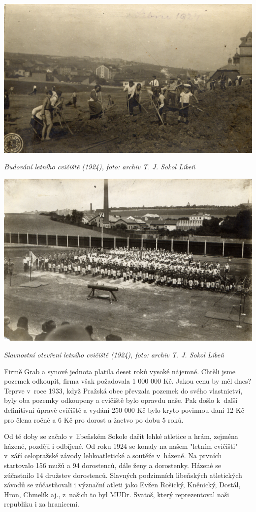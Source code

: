 \documentclass[a5paper, 11pt, twoside]{article}
\begin{document}
 \includegraphics[width=\textwidth]{img/25_budovani_cviciste.jpg}

\textit{Budování letního cvičiště (1924), foto: archiv T. J. Sokol Libeň}

 \includegraphics[width=\textwidth]{img/26_otevreni_cviciste.jpg}

\textit{Slavnostní otevření letního cvičiště (1924), foto: archiv T. J.
Sokol Libeň}

Firmě Grab a synové jednota platila deset roků vysoké nájemné. Chtěli
jsme pozemek odkoupit, firma však požadovala 1 000 000 Kč. Jakou cenu by
měl dnes? Teprve v~roce 1933, když Pražská obec převzala pozemek do
svého vlastnictví, byly oba pozemky odkoupeny a cvičiště bylo opravdu
naše. Pak došlo k~další definitivní úpravě cvičiště a vydání 250 000 Kč
bylo kryto povinnou daní 12 Kč pro člena ročně a 6 Kč pro dorost a
žactvo po dobu 5 roků.

Od té doby se začalo v~libeňském Sokole dařit lehké atletice a hrám,
zejména házené, později i odbíjené. Od roku 1924 se konaly na našem
"letním cvičišti" v~září celopražské závody lehkoatletické a soutěže
v~házené. Na prvních startovalo 156 mužů a 94 dorostenců, dále ženy a
dorostenky. Házené se zúčastnilo 14 družstev dorostenců. Slavných
podzimních libeňských atletických závodů se zúčastňovali i význační
atleti jako Evžen Rošický, Kněnický, Dostál, Hron, Chmelík aj., z~našich
to byl MUDr. Svatoš, který reprezentoval naši republiku i za hranicemi.
\end{document}
